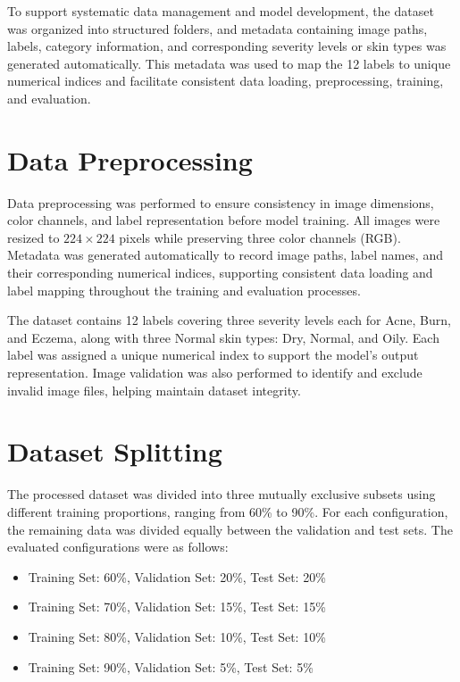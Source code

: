 To support systematic data management and model development, the dataset was organized into structured folders, and metadata containing image paths, labels, category information, and corresponding severity levels or skin types was generated automatically. This metadata was used to map the 12 labels to unique numerical indices and facilitate consistent data loading, preprocessing, training, and evaluation.


\section{Data Preprocessing}
Data preprocessing was performed to ensure consistency in image dimensions, color channels, and label representation before model training. All images were resized to \(224 \times 224\) pixels while preserving three color channels (RGB). Metadata was generated automatically to record image paths, label names, and their corresponding numerical indices, supporting consistent data loading and label mapping throughout the training and evaluation processes.

The dataset contains 12 labels covering three severity levels each for Acne, Burn, and Eczema, along with three Normal skin types: Dry, Normal, and Oily. Each label was assigned a unique numerical index to support the model's output representation. Image validation was also performed to identify and exclude invalid image files, helping maintain dataset integrity.


\section{Dataset Splitting}
The processed dataset was divided into three mutually exclusive subsets using different training proportions, ranging from 60\% to 90\%. For each configuration, the remaining data was divided equally between the validation and test sets. The evaluated configurations were as follows:

\begin{itemize}
\item Training Set: 60\%, Validation Set: 20\%, Test Set: 20\%
\item Training Set: 70\%, Validation Set: 15\%, Test Set: 15\%
\item Training Set: 80\%, Validation Set: 10\%, Test Set: 10\%
\item Training Set: 90\%, Validation Set: 5\%, Test Set: 5\%
\end{itemize}

